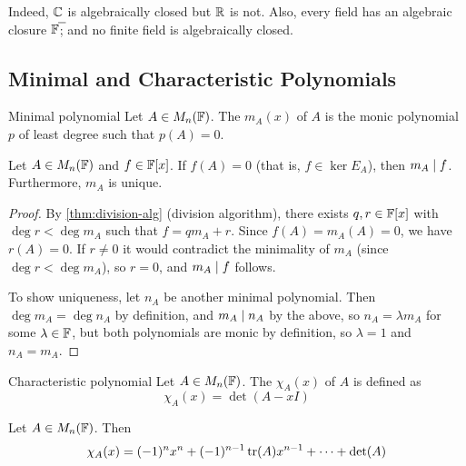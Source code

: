 \documentclass{styles/tufte}
\begin{document}
  Indeed, $\mathbb{C}$ is algebraically closed but $\mathbb{R}$ is not. Also, every field has an algebraic closure $\overline{\FF}$; and no finite field is algebraically closed.


\subsection{Minimal and Characteristic Polynomials}

  \begin{definition}{Minimal polynomial}{}
    Let $A \in M_n(\mathbb{F})$. The  $m_A(x)$ of $A$ is the monic polynomial $p$ of least degree such that $p(A) = 0$.
  \end{definition}
  
  \begin{theorem}{}{}
    Let $A \in M_n(\mathbb{F})$ and $f \in \mathbb{F}[x]$. If $f(A) = 0$ (that is, $f \in \ker E_A$), then $m_A \mid f$. Furthermore, $m_A$ is unique.
  \end{theorem}
  \begin{proof}
    By \cref{thm:division-alg} (division algorithm), there exists $q, r \in \mathbb{F}[x]$ with $\deg r < \deg m_A$ such that $f = q m_A + r$. Since $f(A) = m_A(A) = 0$, we have $r(A) = 0$. If $r \neq 0$ it would contradict the minimality of $m_A$ (since $\deg r < \deg m_A$), so $r = 0$, and $m_A \mid f$ follows.
    
    To show uniqueness, let $n_A$ be another minimal polynomial. Then $\deg m_A = \deg n_A$ by definition, and $m_A \mid n_A$ by the above, so $n_A = \lambda m_A$ for some $\lambda \in \mathbb{F}$, but both polynomials are monic by definition, so $\lambda = 1$ and $n_A = m_A$.
  \end{proof}
  
  \begin{definition}{Characteristic polynomial}{}
    Let $A \in M_n(\mathbb{F})$. The  $\chi_A(x)$ of $A$ is defined as
    \[ \chi_A(x) = \det(A - xI) \]
  \end{definition}
  
  \begin{lemma}{}{}
    Let $A \in M_n(\mathbb{F})$. Then
    \[ \chi_A(x) = (-1)^n x^n + (-1)^{n-1} \tr(A) x^{n-1} + \dots + \det(A) \]
  \end{lemma}
  
\end{document}
